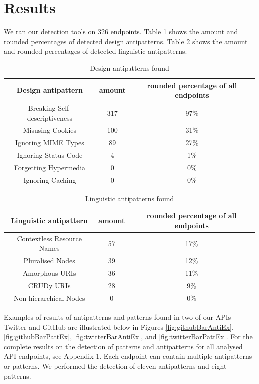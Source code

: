 \section{Results}

We ran our detection tools on 326 endpoints. Table \ref{tab:Design antipatterns found} shows the amount and rounded percentages of detected design antipatterns. Table \ref{tab:Linguistic antipatterns found} shows the amount and rounded percentages of detected linguistic antipatterns.

\begin{table}[htb!]
    \centering
    \begin{tabular}{|c|c|c|} \hline
       Design antipattern & amount & rounded percentage of all endpoints \\ \hline
        Breaking Self-descriptiveness & 317 & 97\%  \\ \hline
        Misusing Cookies & 100 & 31\%  \\ \hline
        Ignoring MIME Types & 89 & 27\%  \\ \hline
        Ignoring Status Code & 4 & 1\%  \\ \hline
        Forgetting Hypermedia & 0 & 0\%  \\ \hline
        Ignoring Caching & 0 & 0\%  \\ \hline
    \end{tabular}
    \caption{Design antipatterns found}
    \label{tab:Design antipatterns found}
\end{table}

\begin{table}[htb!]
    \centering
    \begin{tabular}{|c|c|c|} \hline
        Linguistic antipattern & amount & rounded percentage of all endpoints  \\ \hline
        Contextless Resource Names & 57 & 17\%  \\ \hline
        Pluralised Nodes & 39 & 12\% \\ \hline
        Amorphous URIs & 36 & 11\% \\ \hline
        CRUDy URIs & 28 & 9\% \\ \hline
        Non-hierarchical Nodes & 0 & 0\% \\ \hline
    \end{tabular}
    \caption{Linguistic antipatterns found}
    \label{tab:Linguistic antipatterns found}
\end{table}

Examples of results of antipatterns and patterns found in two of our APIs Twitter and GitHub are illustrated below in Figures \ref{fig:githubBarAntiEx}, \ref{fig:githubBarPattEx}, \ref{fig:twitterBarAntiEx}, and \ref{fig:twitterBarPattEx}. For the complete results on the detection of patterns and antipatterns for all analysed API endpoints, see Appendix 1. Each endpoint can contain multiple antipatterns or patterns. We performed the detection of eleven antipatterns and eight patterns.

